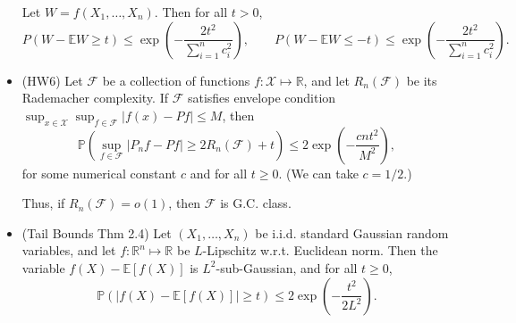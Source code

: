 \documentclass[twoside]{article}
\newcommand{\dis}{\displaystyle}
\newcommand\bbE{\mathbb{E}}
\newcommand\bbP{\mathbb{P}}
\newcommand\bbR{\mathbb{R}}
\newcommand\calF{\mathcal{F}}
\newcommand\calX{\mathcal{X}}
\begin{document}
\begin{itemize}
Let $W = f(X_1, \dots, X_n)$. Then for all $t > 0$,
\[P (W - \bbE W \geq t) \leq \exp \left( - \frac{2t^2}{ \sum_{i=1}^n c_i^2} \right), \qquad P (W - \bbE W \leq -t) \leq \exp \left( - \frac{2t^2}{ \sum_{i=1}^n c_i^2} \right).\]

\item (HW6) Let $\calF$ be a collection of functions $f:\calX \mapsto \bbR$, and let $R_n(\calF)$ be its Rademacher complexity. If $\calF$ satisfies envelope condition $\dis\sup_{x \in \calX}\sup_{f \in \calF} |f(x) - Pf| \leq M$, then
\[ \bbP \left( \sup_{f \in \calF} |P_n f - Pf| \geq 2 R_n(\calF) + t \right) \leq 2 \exp \left(-\frac{cnt^2}{M^2} \right), \]
for some numerical constant $c$ and for all $t \geq 0$. (We can take $c = 1/2$.)

Thus, if $R_n(\calF) = o(1)$, then $\calF$ is G.C. class.

\item (Tail Bounds Thm 2.4) Let $(X_1, \dots, X_n)$ be i.i.d. standard Gaussian random variables, and let $f: \bbR^n \mapsto \bbR$ be $L$-Lipschitz w.r.t. Euclidean norm. Then the variable $f(X) - \bbE[f(X)]$ is $L^2$-sub-Gaussian, and for all $t \geq 0$,
\[ \bbP \left( |f(X) - \bbE [f(X)]| \geq t \right) \leq 2 \exp \left(-\frac{t^2}{2L^2} \right).  \]
\end{itemize}

\end{document}
